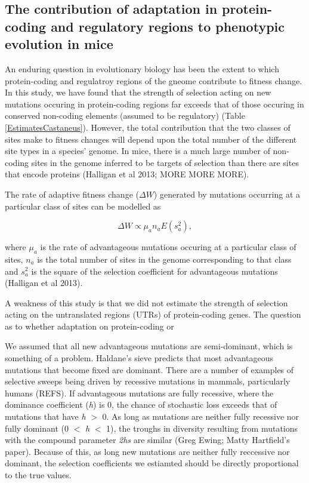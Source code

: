 \documentclass[11pt]{article}
\begin{document}
\subsection*{The contribution of adaptation in protein-coding and regulatory regions to phenotypic evolution in mice}

An enduring question in evolutionary biology has been the extent to which protein-coding and regulatroy regions of the gneome contribute to fitness change. In this study, we have found that the strength of selection acting on new mutations occuring in protein-coding regions far exceeds that of those occuring in conserved non-coding elements (assumed to be regulatory) (Table \ref{EstimatesCastaneus}). However, the total contribution that the two classes of sites make to fitness changes will depend upon the total number of the different site types in a species' genome. In mice, there is a much large number of non-coding sites in the genome inferred to be targets of selection than there are sites that encode proteins (Halligan et al 2013; MORE MORE MORE). 


The rate of adaptive fitness change ($\Delta W$) generated by mutations occurring at a particular class of sites can be modelled as

\begin{equation}
\label{eq:fitness}
\Delta W \propto \mu_a n_a E(s_a^2),
\end{equation}

where $\mu_a$ is the rate of advantageous mutations occuring at a particular class of sites, \textit{$n_a$} is the total number of sites in the genome corresponding to that class and \textit{$s_a^2$} is the square of the selection coefficient for advantageous mutations (Halligan et al 2013). 



A weakness of this study is that we did not estimate the strength of selection acting on the untranslated regions (UTRs) of protein-coding genes. The question as to whether adaptation on protein-coding or 

We assumed that all new advantageous mutations are semi-dominant, which is something of a problem. Haldane's sieve predicts that most advantageous mutations that become fixed are dominant. There are a number of examples of selective sweeps being driven by recessive mutations in mammals, particularly humans (REFS). If advantageous mutations are fully recessive, where the dominance coefficient (\textit{h}) is 0, the chance of stochastic loss exceeds that of mutations that have \textit{h} $>$ 0. As long as mutations are neither fully recessive nor fully dominant (0 $<$ \textit{h} $<$ 1), the troughs in diversity resulting from mutations with the compound parameter \textit{2hs} are similar (Greg Ewing; Matty Hartfield's paper). Because of this, as long new mutations are neither fully reccessive nor dominant, the selection coefficients we estiamted should be directly proportional to the true values.
\end{document}

